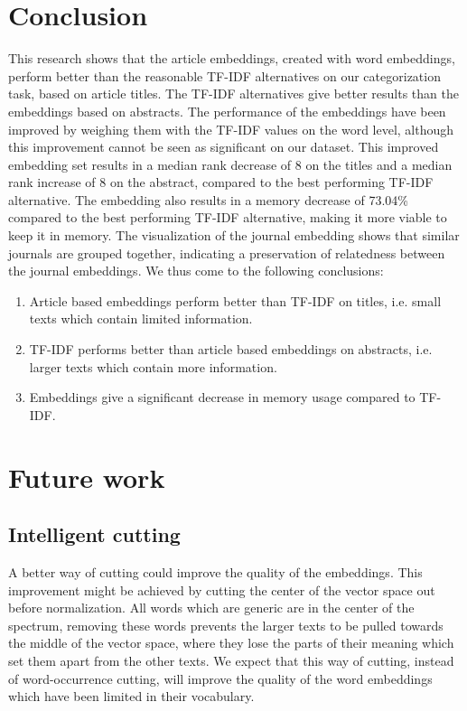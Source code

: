 \documentclass[runningheads]{llncs}
\begin{document}
\section{Conclusion}
This research shows that the article embeddings, created with word embeddings, perform better than the reasonable TF-IDF alternatives on our categorization task, based on article titles. The TF-IDF alternatives give better results than the embeddings based on abstracts. The performance of the embeddings have been improved by weighing them with the TF-IDF values on the word level, although this improvement cannot be seen as significant on our dataset. This improved embedding set results in a median rank decrease of 8 on the titles and a median rank increase of 8 on the abstract, compared to the best performing TF-IDF alternative.  The embedding also results in a memory decrease of 73.04\% compared to the best performing TF-IDF alternative, making it more viable to keep it in memory. The visualization of the journal embedding shows that similar journals are grouped together, indicating a preservation of relatedness between the journal embeddings. We thus come to the following conclusions:
\begin{enumerate}
\item{Article based embeddings perform better than TF-IDF on titles, i.e. small texts which contain limited information.}
\item{TF-IDF performs better than article based embeddings on abstracts, i.e. larger texts which contain more information.}
\item{Embeddings give a significant decrease in memory usage compared to TF-IDF.}
\end{enumerate}
\section{Future work}
\subsection{Intelligent cutting}
A better way of cutting could improve the quality of the embeddings. This improvement might be achieved by cutting the center of the vector space out before normalization. All words which are generic are in the center of the spectrum, removing these words prevents the larger texts to be pulled towards the middle of the vector space, where they lose the parts of their meaning which set them apart from the other texts. We expect that this way of cutting, instead of word-occurrence cutting, will improve the quality of the word embeddings which have been limited in their vocabulary.
\end{document}
